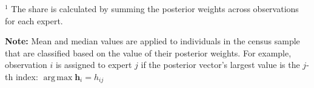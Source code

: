 \documentclass[12pt]{article}
\DeclareMathOperator*{\argmax}{arg\,max}
\theoremstyle{definition}
\begin{document}
\begin{table}
\begin{threeparttable}
\begin{tablenotes}
        \item{\footnotesize $^{1}$ The share is calculated by summing the 
        posterior weights across observations for each expert.}
        \item{\footnotesize \textbf{Note:} Mean and median values are applied to individuals
        in the census sample that are classified based on the value of their posterior weights.
        For example, observation $i$ is assigned to expert $j$ if the posterior vector's
        largest value is the $j$-th index: $\argmax \boldsymbol{h}_{i} = h_{ij}$}
      \end{tablenotes} \label{tbl:HME3_sample_comparison}
    \end{threeparttable}
  \end{table}


\clearpage

\printbibliography
\end{document}
